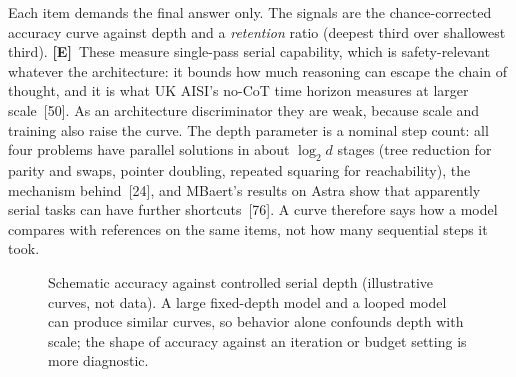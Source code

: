 \documentclass[11pt,letterpaper]{article}
\newcommand{\mE}{\textcolor{deepindigo}{\textbf{[E]}}}
\begin{document}
Each item demands the final answer only. The signals are the chance-corrected accuracy curve against depth and a \emph{retention} ratio (deepest third over shallowest third). \mE\ These measure single-pass serial capability, which is safety-relevant whatever the architecture: it bounds how much reasoning can escape the chain of thought, and it is what UK AISI's no-CoT time horizon measures at larger scale~[50]. As an architecture discriminator they are weak, because scale and training also raise the curve. The depth parameter is a nominal step count: all four problems have parallel solutions in about $\log_2 d$ stages (tree reduction for parity and swaps, pointer doubling, repeated squaring for reachability), the mechanism behind~[24], and MBaert's results on Astra show that apparently serial tasks can have further shortcuts~[76]. A curve therefore says how a model compares with references on the same items, not how many sequential steps it took.

\begin{figure}[htbp]
\centering
{}
\caption[Schematic accuracy against controlled serial depth]{Schematic accuracy against controlled serial depth (illustrative curves, not data). A large fixed-depth model and a looped model can produce similar curves, so behavior alone confounds depth with scale; the shape of accuracy against an iteration or budget setting is more diagnostic.}
\label{fig:depthcurves}
\end{figure}
\end{document}
